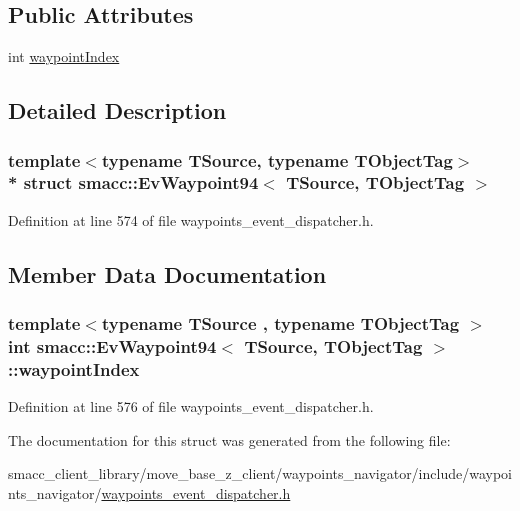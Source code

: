 \subsection*{Public Attributes}
\begin{DoxyCompactItemize}
\item 
int \hyperlink{structsmacc_1_1EvWaypoint94_a809895318998bc3d0aba3a72a5b584a0}{waypoint\+Index}
\end{DoxyCompactItemize}


\subsection{Detailed Description}
\subsubsection*{template$<$typename T\+Source, typename T\+Object\+Tag$>$\\*
struct smacc\+::\+Ev\+Waypoint94$<$ T\+Source, T\+Object\+Tag $>$}



Definition at line 574 of file waypoints\+\_\+event\+\_\+dispatcher.\+h.



\subsection{Member Data Documentation}
\subsubsection[{\texorpdfstring{waypoint\+Index}{waypointIndex}}]{\setlength{\rightskip}{0pt plus 5cm}template$<$typename T\+Source , typename T\+Object\+Tag $>$ int {\bf smacc\+::\+Ev\+Waypoint94}$<$ T\+Source, T\+Object\+Tag $>$\+::waypoint\+Index}\hypertarget{structsmacc_1_1EvWaypoint94_a809895318998bc3d0aba3a72a5b584a0}{}\label{structsmacc_1_1EvWaypoint94_a809895318998bc3d0aba3a72a5b584a0}


Definition at line 576 of file waypoints\+\_\+event\+\_\+dispatcher.\+h.



The documentation for this struct was generated from the following file\+:\begin{DoxyCompactItemize}
\item 
smacc\+\_\+client\+\_\+library/move\+\_\+base\+\_\+z\+\_\+client/waypoints\+\_\+navigator/include/waypoints\+\_\+navigator/\hyperlink{waypoints__event__dispatcher_8h}{waypoints\+\_\+event\+\_\+dispatcher.\+h}\end{DoxyCompactItemize}
